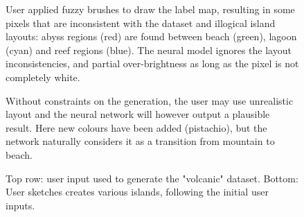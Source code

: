 \begin{figure}
    \caption[Output of the cGAN on fuzzy inputs]{User applied fuzzy brushes to draw the label map, resulting in some pixels that are inconsistent with the dataset and illogical island layouts: abyss regions (red) are found between beach (green), lagoon (cyan) and reef regions (blue). The neural model ignores the layout inconsistencies, and partial over-brightness as long as the pixel is not completely white.}
    \label{fig:coral-island-results-fuzzy}
\end{figure}
\begin{figure}
    \caption[Output of the cGAN with new colors in the input]{Without constraints on the generation, the user may use unrealistic layout and the neural network will however output a plausible result. Here new colours have been added (pistachio), but the network naturally considers it as a transition from mountain to beach.}
    \label{fig:coral-island-results-dino}
\end{figure}

\begin{figure}
    \caption[cGAN outputs trained on volcanic dataset]{Top row: user input used to generate the "volcanic" dataset. Bottom: User sketches creates various islands, following the initial user inputs. }
    \label{fig:coral-island-results-volcanic-training}
\end{figure}


